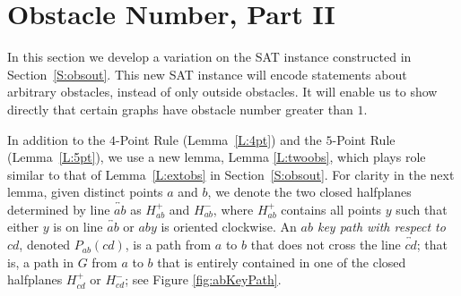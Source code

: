 \documentclass[12pt]{amsart}
\theoremstyle{remark}
\begin{document}
\section{Obstacle Number, Part II} \label{S:obs2}

In this section we develop a variation on the SAT instance constructed
in Section~\ref{S:obsout}.
This new SAT instance will encode statements about arbitrary obstacles, instead of only outside obstacles. It will enable us to show directly that certain graphs have obstacle number greater than $1$.

In addition to
the $4$-Point Rule (Lemma~\ref{L:4pt})
and the $5$-Point Rule (Lemma~\ref{L:5pt}),
we use a new lemma, Lemma \ref{L:twoobs},
which plays role similar to that of Lemma~\ref{L:extobs}
in Section~\ref{S:obsout}.
For clarity in the next lemma, given distinct points $a$ and $b$, we denote the two closed halfplanes determined by line $\overleftrightarrow{ab}$ as $H^{+}_{ab}$ and $H^{-}_{ab}$, where  $H^{+}_{ab}$ contains all points $y$ such that either $y$ is on line $\overleftrightarrow{ab}$ or $aby$ is oriented clockwise.
An \emph{$ab$ key path with respect to $cd$}, denoted $P_{ab}(cd)$,
is a path from $a$ to $b$ that does not cross the line 
$\overleftrightarrow{cd}$;
that is, a path in $G$ from $a$ to $b$ that is entirely contained
in one of the closed halfplanes $H^{+}_{cd}$ or $H^{-}_{cd}$; see Figure \ref{fig:abKeyPath}.
\end{document}
